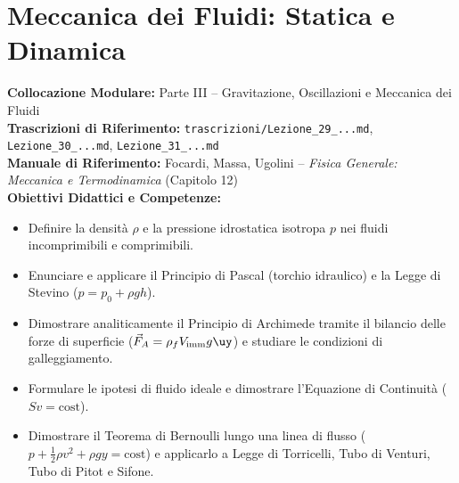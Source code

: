 \chapter{Meccanica dei Fluidi: Statica e Dinamica}
\label{chap:meccanica_fluidi}

\begin{tcolorbox}[enhanced, breakable, colback=navyblue!4!white, colframe=navyblue!80!black,
    coltitle=white, fonttitle=\bfseries\sffamily, title={Quadro Sinottico del Capitolo 11 (Corrispondenza: Lezioni 29, 30 e 31)},
    sharp corners, rounded corners=south, boxrule=1pt]
\textbf{Collocazione Modulare:} Parte III -- Gravitazione, Oscillazioni e Meccanica dei Fluidi\\
\textbf{Trascrizioni di Riferimento:} \texttt{trascrizioni/Lezione\_29\_...md}, \texttt{Lezione\_30\_...md}, \texttt{Lezione\_31\_...md}\\
\textbf{Manuale di Riferimento:} Focardi, Massa, Ugolini -- \emph{Fisica Generale: Meccanica e Termodinamica} (Capitolo 12)\\
\textbf{Obiettivi Didattici e Competenze:}\par
\begin{itemize}
    \item Definire la densità $\rho$ e la pressione idrostatica isotropa $p$ nei fluidi incomprimibili e comprimibili.
    \item Enunciare e applicare il Principio di Pascal (torchio idraulico) e la Legge di Stevino ($p = p_0 + \rho g h$).
    \item Dimostrare analiticamente il Principio di Archimede tramite il bilancio delle forze di superficie ($\vec{F}_A = \rho_f V_{\text{imm}} g\uy$) e studiare le condizioni di galleggiamento.
    \item Formulare le ipotesi di fluido ideale e dimostrare l'Equazione di Continuità ($S v = \text{cost}$).
    \item Dimostrare il Teorema di Bernoulli lungo una linea di flusso ($p + \frac{1}{2}\rho v^2 + \rho gy = \text{cost}$) e applicarlo a Legge di Torricelli, Tubo di Venturi, Tubo di Pitot e Sifone.
\end{itemize}
\end{tcolorbox}

\vspace{0.5em}

